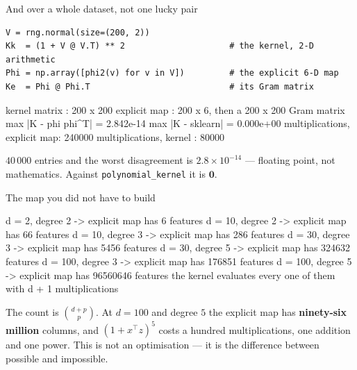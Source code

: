 \documentclass[aspectratio=169]{beamer}
\begin{document}
\begin{frame}[fragile,shrink=6]{And over a whole dataset, not one lucky pair}
\begin{lstlisting}
V = rng.normal(size=(200, 2))
Kk  = (1 + V @ V.T) ** 2                     # the kernel, 2-D arithmetic
Phi = np.array([phi2(v) for v in V])         # the explicit 6-D map
Ke  = Phi @ Phi.T                            # its Gram matrix
\end{lstlisting}
\begin{outblk}
kernel matrix       : 200 x 200
explicit map        : 200 x 6, then a 200 x 200 Gram matrix
max |K - phi phi^T| = 2.842e-14
max |K - sklearn|   = 0.000e+00
multiplications, explicit map: 240000
multiplications, kernel      : 80000
\end{outblk}
  \begin{center}\small
    $40\,000$ entries and the worst disagreement is
    $2.8\times10^{-14}$ --- floating point, not mathematics. Against
    \texttt{polynomial\_kernel} it is $\mathbf{0}$.
  \end{center}
\end{frame}

\begin{frame}[fragile,shrink=6]{The map you did not have to build}
\begin{outblk}
d =   2, degree 2 -> explicit map has        6 features
d =  10, degree 2 -> explicit map has       66 features
d =  10, degree 3 -> explicit map has      286 features
d =  30, degree 3 -> explicit map has     5456 features
d =  30, degree 5 -> explicit map has   324632 features
d = 100, degree 3 -> explicit map has   176851 features
d = 100, degree 5 -> explicit map has 96560646 features
the kernel evaluates every one of them with d + 1 multiplications
\end{outblk}
  \begin{center}\small
    The count is $\binom{d+p}{p}$. At $d = 100$ and degree $5$ the explicit
    map has \textbf{ninety-six million} columns, and
    $(1 + x^\top z)^5$ costs a hundred multiplications, one addition and one
    power. This is not an optimisation --- it is the difference between
    possible and impossible.
  \end{center}
\end{frame}
\end{document}
